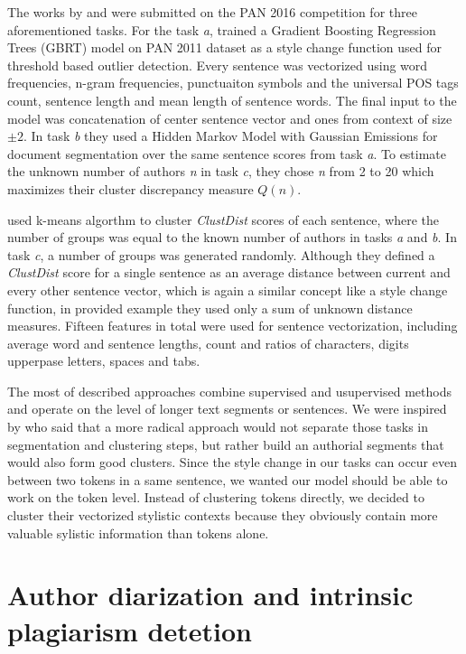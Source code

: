 \documentclass[10pt, a4paper]{article}
\begin{document}
The works by \citet{kuznetsov-2016} and \citet{sittar-2016} were submitted on the PAN 2016 competition for three aforementioned tasks. For the task \textit{a}, \citet{kuznetsov-2016} trained a Gradient Boosting Regression Trees (GBRT) model on PAN 2011 dataset as a style change function used for threshold based outlier detection. Every sentence was vectorized using word frequencies, n-gram frequencies, punctuaiton symbols and the universal POS tags count, sentence length and mean length of sentence words. The final input to the model was concatenation of center sentence vector and ones from context of size $\pm2$. In task \textit{b} they used a Hidden Markov Model with Gaussian Emissions for document segmentation over the same sentence scores from task \textit{a}. To estimate the unknown number of authors \textit{n} in task \textit{c}, they chose \textit{n} from 2 to 20 which maximizes their cluster discrepancy measure $Q(n)$.

\citet{sittar-2016} used k-means algorthm to cluster \textit{ClustDist} scores of each sentence, where the number of groups was equal to the known number of authors in tasks \textit{a} and \textit{b}. In task \textit{c}, a number of groups was generated randomly. Although they defined a \textit{ClustDist} score for a single sentence as an average distance between current and every other sentence vector, which is again a similar concept like a style change function, in provided example they used only a sum of unknown distance measures. Fifteen features in total were used for sentence vectorization, including average word and sentence lengths, count and ratios of characters, digits upperpase letters, spaces and tabs. 

The most of described approaches combine supervised and usupervised methods and operate on the level of longer text segments or sentences. We were inspired by \citet{brooke-2013} who said that a more radical approach would not separate those tasks in segmentation and clustering steps, but rather build an authorial segments that would also form good clusters. Since the style change in our tasks can occur even between two tokens in a same sentence, we wanted our model should be able to work on the token level. Instead of clustering tokens directly, we decided to cluster their vectorized stylistic contexts because they obviously contain more valuable sylistic information than tokens alone.

\section{Author diarization and intrinsic plagiarism detetion}
\end{document}
